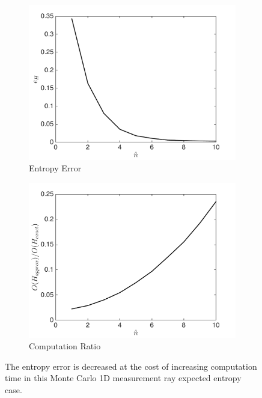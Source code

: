 \documentclass[smallextended]{svjour3}       %
\begin{document}
\begin{figure}
	\centering
    	\begin{subfigure}[b]{0.35\textwidth}
        		\includegraphics[width=\textwidth]{JustifyApprox_eH.pdf}
        		\caption{Entropy Error}
        		\label{fig:H_err}
    	\end{subfigure}
	\begin{subfigure}[b]{0.35\textwidth}
        		\includegraphics[width=\textwidth]{JustifyApprox_t.pdf}
        		\caption{Computation Ratio}
        		\label{fig:H_comp_ratio}
    	\end{subfigure}

\caption{The entropy error is decreased at the cost of increasing computation time in this Monte Carlo 1D measurement ray expected entropy case.}
\label{fig:ApproxJust}
\end{figure}
\end{document}
